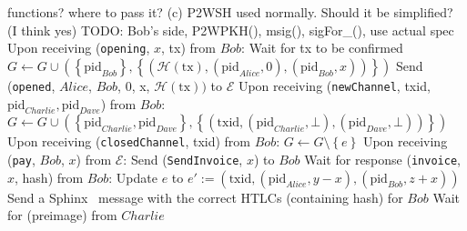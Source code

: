 \begin{algorithmic}[1]
    functions? where to pass it? (c) P2WSH used normally. Should it be simplified? (I
    think yes)
    \State TODO: Bob's side, P2WPKH(), msig(), sigFor\_(), use actual spec
    \State
    \State Upon receiving (\texttt{opening}, $x$, tx) from $Bob$:
      \State Wait for tx to be confirmed
      \State $G \leftarrow G \cup \left(\left\{\mathrm{pid}_{Bob}\right\},
      \left\{\left(\mathcal{H}\left(\mathrm{tx}\right), \left(\mathrm{pid}_{Alice},
      0\right), \left(\mathrm{pid}_{Bob}, x\right)\right)\right\}\right)$ 
      \State Send (\texttt{opened}, $Alice$, $Bob$, 0, x,
      $\mathcal{H}\left(\mathrm{tx}\right))$ to $\mathcal{E}$
    \State
    \State Upon receiving (\texttt{newChannel}, txid, $\mathrm{pid}_{Charlie},
    \mathrm{pid}_{Dave}$) from $Bob$:
        \State $G \leftarrow G \cup \left(\left\{\mathrm{pid}_{Charlie},
        \mathrm{pid}_{Dave}\right\}, \left\{\left(\mathrm{txid},
        \left(\mathrm{pid}_{Charlie}, \bot\right), \left(\mathrm{pid}_{Dave},
        \bot\right)\right)\right\}\right)$ 
      \EndIf
    \State
    \State Upon receiving (\texttt{closedChannel}, txid) from $Bob$:
        \State $G \leftarrow G \setminus \left\{e\right\}$
      \EndIf
    \State
    \State Upon receiving (\texttt{pay}, $Bob$, $x$) from $\mathcal{E}$:
      \State Send (\texttt{SendInvoice}, $x$) to $Bob$
      \State Wait for response (\texttt{invoice}, $x$, hash) from $Bob$:
        \State Update $e$ to $e' := \left(\mathrm{txid},
        \left(\mathrm{pid}_{Alice}, y - x\right),
        \left(\mathrm{pid}_{Bob}, z + x\right)\right)$ 
        \State Send a Sphinx~\cite{sphinx} message with the correct HTLCs (containing
        hash) for $Bob$
        \State {}
        \State Wait for (preimage) from $Charlie$

\end{algorithmic}
